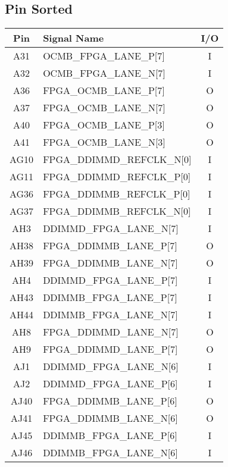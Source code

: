 \subsection{Pin Sorted}
\begin{longtable}[l]{| c | l | c |}
  \hline
  Pin  & Signal Name                  & I/O \\ \hline
  \endhead
  A31  & OCMB\_FPGA\_LANE\_P[7]       & I   \\ \hline
  A32  & OCMB\_FPGA\_LANE\_N[7]       & I   \\ \hline
  A36  & FPGA\_OCMB\_LANE\_P[7]       & O   \\ \hline
  A37  & FPGA\_OCMB\_LANE\_N[7]       & O   \\ \hline
  A40  & FPGA\_OCMB\_LANE\_P[3]       & O   \\ \hline
  A41  & FPGA\_OCMB\_LANE\_N[3]       & O   \\ \hline
  AG10 & FPGA\_DDIMMD\_REFCLK\_N[0]   & I   \\ \hline
  AG11 & FPGA\_DDIMMD\_REFCLK\_P[0]   & I   \\ \hline
  AG36 & FPGA\_DDIMMB\_REFCLK\_P[0]   & I   \\ \hline
  AG37 & FPGA\_DDIMMB\_REFCLK\_N[0]   & I   \\ \hline
  AH3  & DDIMMD\_FPGA\_LANE\_N[7]     & I   \\ \hline
  AH38 & FPGA\_DDIMMB\_LANE\_P[7]     & O   \\ \hline
  AH39 & FPGA\_DDIMMB\_LANE\_N[7]     & O   \\ \hline
  AH4  & DDIMMD\_FPGA\_LANE\_P[7]     & I   \\ \hline
  AH43 & DDIMMB\_FPGA\_LANE\_P[7]     & I   \\ \hline
  AH44 & DDIMMB\_FPGA\_LANE\_N[7]     & I   \\ \hline
  AH8  & FPGA\_DDIMMD\_LANE\_N[7]     & O   \\ \hline
  AH9  & FPGA\_DDIMMD\_LANE\_P[7]     & O   \\ \hline
  AJ1  & DDIMMD\_FPGA\_LANE\_N[6]     & I   \\ \hline
  AJ2  & DDIMMD\_FPGA\_LANE\_P[6]     & I   \\ \hline
  AJ40 & FPGA\_DDIMMB\_LANE\_P[6]     & O   \\ \hline
  AJ41 & FPGA\_DDIMMB\_LANE\_N[6]     & O   \\ \hline
  AJ45 & DDIMMB\_FPGA\_LANE\_P[6]     & I   \\ \hline
  AJ46 & DDIMMB\_FPGA\_LANE\_N[6]     & I   \\ \hline

\end{longtable}
